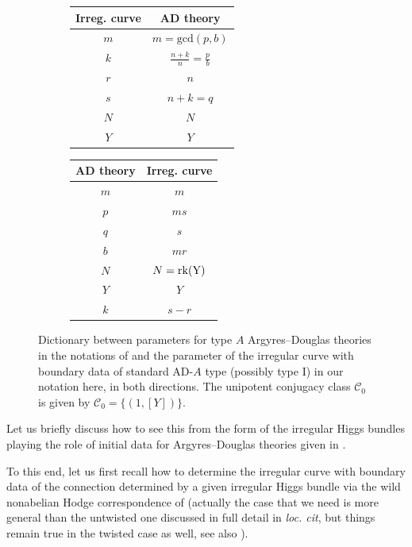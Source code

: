 \documentclass[11pt,a4paper]{amsart}
\numberwithin{equation}{section}
\begin{document}
\begin{figure}
\centering

\begin{subfigure}[b]{0.45\textwidth}
\centering

\begin{tabular}{|c|c|}
\hline
Irreg. curve  & AD theory\\
\hline
$m$ & $m=\mathrm{gcd}(p, b)$\\
\hline
$k$ & $\frac{n+k}{n}=\frac{p}{b}$\\
\hline
$r$ & $n$\\
\hline
$s$ & $n+k=q$\\
\hline
$N$ & $N$\\
\hline
$Y$ & $Y$\\
\hline
\end{tabular}
\end{subfigure}
\hfill
\begin{subfigure}[b]{0.45\textwidth}
\centering
\begin{tabular}{|c|c|}
\hline
AD theory & Irreg. curve\\
\hline
$m$ & $m$\\
\hline
$p$ & $ms$\\
\hline
$q$ & $s$\\
\hline
$b$ & $mr$\\
\hline
$N$ & $N=\rm{rk}(Y)$\\
\hline
$Y$ & $Y$\\
\hline
$k$ & $s-r$\\
\hline

\end{tabular}
\end{subfigure}
\caption{Dictionary between parameters for type $A$ Argyres--Douglas theories in the notations of \cite{beem2025simplifying} and the parameter of the irregular curve with boundary data of standard AD-$A$ type (possibly type I) in our notation here, in both directions. The unipotent conjugacy class $\mathcal C_0$ is given by $\mathcal C_0=\{(1, [Y])\}$.}
\label{fig:dictionary_notations}
\end{figure}


Let us briefly discuss how to see this from the form of the irregular Higgs bundles playing the role of initial data for Argyres--Douglas theories given in \cite[§2.1]{beem2025simplifying}.

To this end, let us first recall how to determine the irregular curve with boundary data of the connection determined by a given irregular Higgs bundle via the wild nonabelian Hodge correspondence of \cite{biquard2004wild} (actually the case that we need is more general than the untwisted one discussed in full detail in  \emph{loc. cit}, but things remain true in the twisted case as well, see also \cite{chuang2020twisted,eper2025rank}).
\end{document}
